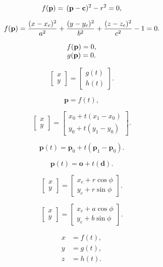 \documentclass[lang=cn,12pt,marginpar=margintrue]{elegantbook}
\begin{document}
\[
  f({\bf p})=\,({\bf p}-{\bf c})^{2}-r^{2}=0,
\]

\[
  f({\bf p})=\frac{(x-x_{c})^{2}}{a^{2}}+\frac{(y-y_{c})^{2}}{b^{2}}+\frac{(z-z_{c})^{2}}{c^{2}}-1=0.
\]

\[
  \begin{array}{c l c r}{{f({\bf p})=0,}}\\ {{g({\bf p})=0.}}\end{array}
\]

\[
  \begin{bmatrix}
    x \\
    y
  \end{bmatrix}=
  \begin{bmatrix}
    g(t) \\
    h(t)
  \end{bmatrix}.
\]

\[
  \mathbf{p}=f(t),
\]

\[
  \begin{bmatrix}
    x \\
    y
  \end{bmatrix}=
  \begin{bmatrix}
    x_0+t(x_1-x_0) \\
    y_0+t(y_1-y_0)
  \end{bmatrix}.
\]

\[
  \mathbf{p}(t)=\mathbf{p}_{0}+t(\mathbf{p}_{1}-\mathbf{p}_{0}).
\]

\[
  \mathbf{p}(t)=\mathbf{o}+t(\mathbf{d}).
\]

\[
  \begin{bmatrix}
    x \\
    y
  \end{bmatrix}=
  \begin{bmatrix}
    x_c+r\cos\phi \\
    y_c+r\sin\phi
  \end{bmatrix}.
\]

\[
  \begin{bmatrix}
    x \\
    y
  \end{bmatrix}=
  \begin{bmatrix}
    x_c+a\cos\phi \\
    y_c+b\sin\phi
  \end{bmatrix}.
\]

\[
  \begin{aligned}
    x & =f(t), \\
    y & =g(t), \\
    z & =h(t).
  \end{aligned}
\]
\end{document}
